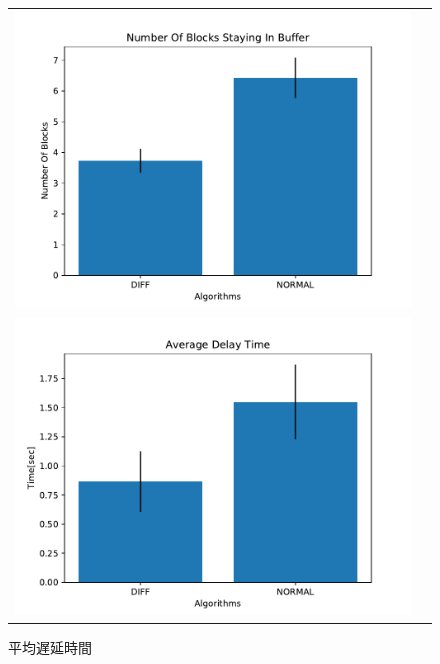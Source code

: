 \documentclass[a4j,12pt]{gradthesis_utf8}
\begin{document}
\begin{figure}[ht]
	\begin{center}
		\begin{tabular}{cc}
        	\begin{minipage}[t]{0.9\hsize}
				\includegraphics[width=14cm]{figure/NumberOfBlocksStayingInBufferPub.pdf}
				\caption{平均非有効ブロック数}
				\label{nsbpub}
			\end{minipage}\\
			\begin{minipage}[t]{0.9\hsize}
				\includegraphics[width=14cm]{figure/AverageDelayTimePub.pdf}
				\caption{平均遅延時間}
				\label{adtpub}
			\end{minipage}
		\end{tabular}
	\end{center}
\end{figure}
\end{document}
